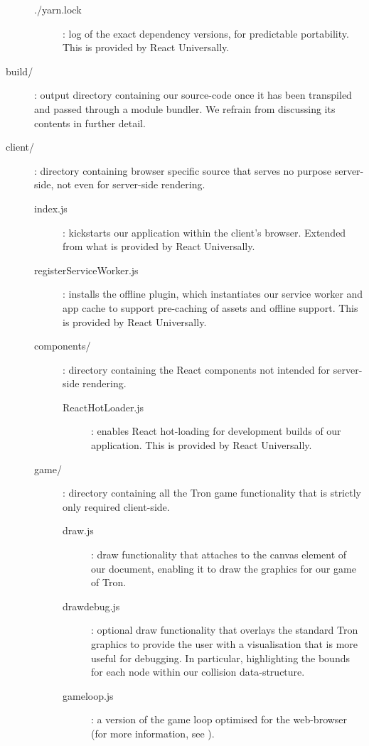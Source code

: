 \documentclass{standalone}
\begin{document}
\begin{formal}
\begin{description}
\begin{description}
		        	\item[./yarn.lock]: log of the exact dependency versions, for predictable portability. This is provided by React Universally.
		      	\end{description}

	        \item[build/]: output directory containing our source-code once it has been transpiled and passed through a module bundler. We refrain from discussing its contents in further detail.

	      	\item[client/]: directory containing browser specific source that serves no purpose server-side, not even for server-side rendering.
	        \begin{description}
	        	\item[index.js]: kickstarts our application within the client's browser. Extended from what is provided by React Universally.
	        	\item[registerServiceWorker.js]: installs the offline plugin, which instantiates our service worker and app cache to support pre-caching of assets and offline support. This is provided by React Universally.

		        \item[components/]: directory containing the React components not intended for server-side rendering.
		      	\begin{description}
	        		\item[ReactHotLoader.js]: enables React hot-loading for development builds of our application. This is provided by React Universally.
        		\end{description}

		        \item[game/]: directory containing all the Tron game functionality that is strictly only required client-side.
		      	\begin{description}
		        	\item[draw.js]: draw functionality that attaches to the canvas element of our document, enabling it to draw the graphics for our game of Tron.
		        	\item[drawdebug.js]: optional draw functionality that overlays the standard Tron graphics to provide the user with a visualisation that is more useful for debugging. In particular, highlighting the bounds for each node within our collision data-structure.
		        	\item[gameloop.js]: a version of the game loop optimised for the web-browser (for more information, see ).


\end{description}
\end{description}
\end{description}
\end{formal}
\end{document}
